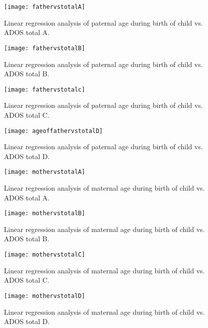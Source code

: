 \documentclass{article}
\begin{document}
\begin{figure}[!htb]
  \centering
  \begin{minipage}[h!]{0.49\linewidth}
    \texttt{[image: fathervstotalA]}
    \caption{Linear regression analysis of paternal age during birth of child vs. ADOS total A.}
  \end{minipage}
  \hfill
  \begin{minipage}[h!]{0.49\linewidth}
    \texttt{[image: fathervstotalB]}
    \caption{Linear regression analysis of paternal age during birth of child vs. ADOS total B.}
  \end{minipage}
\end{figure}

\begin{figure}[!htb]
  \centering
  \begin{minipage}[h!]{0.49\linewidth}
    \texttt{[image: fathervstotalc]}
    \caption{Linear regression analysis of paternal age during birth of child vs. ADOS total C.}
  \end{minipage}
  \hfill
  \begin{minipage}[h!]{0.49\linewidth}
    \texttt{[image: ageoffathervstotalD]}
    \caption{Linear regression analysis of paternal age during birth of child vs. ADOS total D.}
  \end{minipage}
\end{figure}

\begin{figure}[!htb]
  \centering
  \begin{minipage}[h!]{0.49\linewidth}
    \texttt{[image: mothervstotalA]}
    \caption{Linear regression analysis of maternal age during birth of child vs. ADOS total A.}
  \end{minipage}
  \hfill
  \begin{minipage}[h!]{0.49\linewidth}
    \texttt{[image: mothervstotalB]}
    \caption{Linear regression analysis of maternal age during birth of child vs. ADOS total B.}
  \end{minipage}
\end{figure}

\begin{figure}[!htb]
  \centering
  \begin{minipage}[h!]{0.49\linewidth}
    \texttt{[image: mothervstotalC]}
    \caption{Linear regression analysis of maternal age during birth of child vs. ADOS total C.}
  \end{minipage}
  \hfill
  \begin{minipage}[h!]{0.49\linewidth}
    \texttt{[image: mothervstotalD]}
    \caption{Linear regression analysis of maternal age during birth of child vs. ADOS total D.}
  \end{minipage}
\end{figure}
\end{document}
